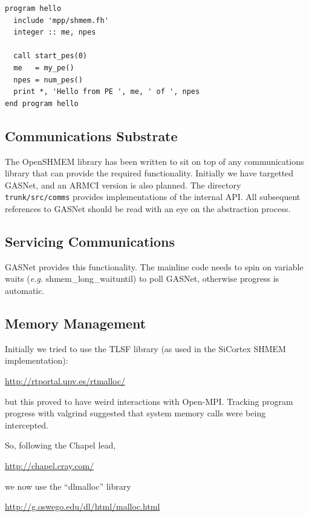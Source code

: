 \documentclass[english]{article}
\begin{document}
\vspace{0.1in}
\begin{minipage}{\linewidth}
\begin{lstlisting}
program hello
  include 'mpp/shmem.fh'
  integer :: me, npes

  call start_pes(0)
  me   = my_pe()
  npes = num_pes()
  print *, 'Hello from PE ', me, ' of ', npes
end program hello
\end{lstlisting}
\end{minipage}


\subsection{Communications Substrate}

The OpenSHMEM library has been written to sit on top of any communications
library that can provide the required functionality. Initially we
have targetted GASNet, and an ARMCI version is also planned. The directory\texttt{
trunk/src/comms} provides implementations of the internal API. All
subsequent references to GASNet should be read with an eye on the
abstraction process.


\subsection{Servicing Communications}

GASNet provides this functionality. The mainline code needs to spin
on variable waits (\emph{e.g.} shmem\_long\_waituntil) to poll GASNet,
otherwise progress is automatic.


\subsection{Memory Management}

Initially we tried to use the TLSF library (as used in the SiCortex
SHMEM implementation):

\url{http://rtportal.upv.es/rtmalloc/}

but this proved to have weird interactions with Open-MPI. Tracking
program progress with valgrind suggested that system memory calls
were being intercepted.

So, following the Chapel lead,

\url{http://chapel.cray.com/}

we now use the {}``dlmalloc'' library

\url{http://g.oswego.edu/dl/html/malloc.html}
\end{document}
